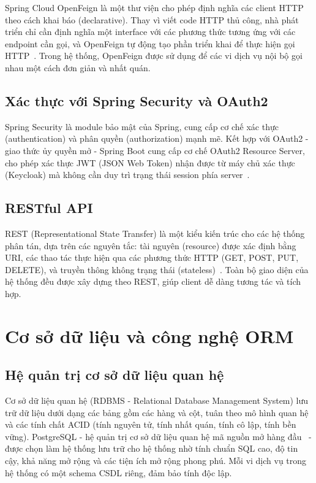 \documentclass[../BTL.tex]{subfiles}
\begin{document}
Spring Cloud OpenFeign là một thư viện cho phép định nghĩa các client HTTP theo cách khai báo (declarative). Thay vì viết code HTTP thủ công, nhà phát triển chỉ cần định nghĩa một interface với các phương thức tương ứng với các endpoint cần gọi, và OpenFeign tự động tạo phần triển khai để thực hiện gọi HTTP~\cite{openfeigndocs}. Trong hệ thống, OpenFeign được sử dụng để các vi dịch vụ nội bộ gọi nhau một cách đơn giản và nhất quán.

\subsection{Xác thực với Spring Security và OAuth2}
\label{section:1.3.5}

Spring Security là module bảo mật của Spring, cung cấp cơ chế xác thực (authentication) và phân quyền (authorization) mạnh mẽ. Kết hợp với OAuth2 - giao thức ủy quyền mở - Spring Boot cung cấp cơ chế OAuth2 Resource Server, cho phép xác thực JWT (JSON Web Token) nhận được từ máy chủ xác thực (Keycloak) mà không cần duy trì trạng thái session phía server~\cite{springsecuritydocs}.

\subsection{RESTful API}
\label{section:1.3.6}

REST (Representational State Transfer) là một kiểu kiến trúc cho các hệ thống phân tán, dựa trên các nguyên tắc: tài nguyên (resource) được xác định bằng URI, các thao tác thực hiện qua các phương thức HTTP (GET, POST, PUT, DELETE), và truyền thông không trạng thái (stateless)~\cite{fielding2000rest}. Toàn bộ giao diện của hệ thống đều được xây dựng theo REST, giúp client dễ dàng tương tác và tích hợp.

\section{Cơ sở dữ liệu và công nghệ ORM}
\label{section:1.4}

\subsection{Hệ quản trị cơ sở dữ liệu quan hệ}
\label{section:1.4.1}

Cơ sở dữ liệu quan hệ (RDBMS - Relational Database Management System) lưu trữ dữ liệu dưới dạng các bảng gồm các hàng và cột, tuân theo mô hình quan hệ và các tính chất ACID (tính nguyên tử, tính nhất quán, tính cô lập, tính bền vững). PostgreSQL - hệ quản trị cơ sở dữ liệu quan hệ mã nguồn mở hàng đầu~\cite{postgresqldocs} - được chọn làm hệ thống lưu trữ cho hệ thống nhờ tính chuẩn SQL cao, độ tin cậy, khả năng mở rộng và các tiện ích mở rộng phong phú. Mỗi vi dịch vụ trong hệ thống có một schema CSDL riêng, đảm bảo tính độc lập.
\end{document}
